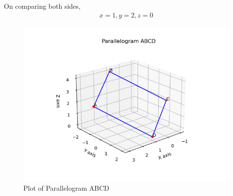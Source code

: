 \documentclass[journal]{IEEEtran}
\begin{document}
On comparing both sides, 
\begin{align}
x=1, y=2, z=0
\end{align}
\begin{figure}[h!]
   \centering
   \includegraphics[width=\linewidth]{figs/Figure_1.png}
   \caption{Plot of Parallelogram ABCD}
   \label{stemplot}
\end{figure}
\end{document}
